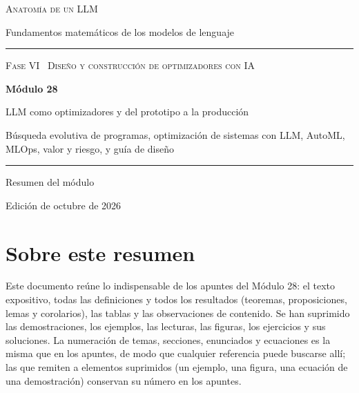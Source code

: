 \documentclass[11pt,a4paper,twoside,openany]{book}
\begin{document}
\frontmatter
\begin{titlepage}
\centering
\vspace*{2.5cm}
{\large\scshape Anatomía de un LLM}\par
\vspace{0.4cm}
{\normalsize Fundamentos matemáticos de los modelos de lenguaje}\par
\vspace{2.2cm}
\rule{\textwidth}{0.8pt}\par\vspace{0.5cm}
{\small\scshape Fase VI \textperiodcentered\ Diseño y construcción de optimizadores con IA}\par\vspace{0.3cm}
{\Huge\bfseries Módulo 28\par}\vspace{0.3cm}
{\LARGE LLM como optimizadores y del prototipo a la producción\par}
\vspace{0.2cm}
{\large Búsqueda evolutiva de programas, optimización de sistemas con LLM, AutoML, MLOps, valor y riesgo, y guía de diseño\par}
\vspace{0.5cm}\rule{\textwidth}{0.4pt}\par
\vspace{1.6cm}
{\large Resumen del módulo}\par
\vfill
{\small Edición de octubre de 2026}\par
\end{titlepage}

\chapter*{Sobre este resumen}

Este documento reúne lo indispensable de los apuntes del Módulo 28: el texto expositivo, todas las definiciones y todos los resultados (teoremas, proposiciones, lemas y corolarios), las tablas y las observaciones de contenido. Se han suprimido las demostraciones, los ejemplos, las lecturas, las figuras, los ejercicios y sus soluciones. La numeración de temas, secciones, enunciados y ecuaciones es la misma que en los apuntes, de modo que cualquier referencia puede buscarse allí; las que remiten a elementos suprimidos (un ejemplo, una figura, una ecuación de una demostración) conservan su número en los apuntes.
\end{document}
